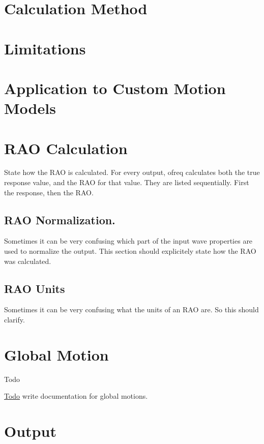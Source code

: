 \section*{Calculation Method}

\section*{Limitations}

\section*{Application to Custom Motion Models}

\section*{R\-A\-O Calculation}

State how the R\-A\-O is calculated. For every output, ofreq calculates both the true response value, and the R\-A\-O for that value. They are listed sequentially. First the response, then the R\-A\-O.

\subsection*{R\-A\-O Normalization.}

Sometimes it can be very confusing which part of the input wave properties are used to normalize the output. This section should explicitely state how the R\-A\-O was calculated.

\subsection*{R\-A\-O Units}

Sometimes it can be very confusing what the units of an R\-A\-O are. So this should clarify. \hypertarget{global_motion}{}\section{Global Motion}\label{global_motion}
\begin{DoxyRefDesc}{Todo}
\item[\hyperlink{todo__todo000021}{Todo}]write documentation for global motions.\end{DoxyRefDesc}


\section*{Output}

